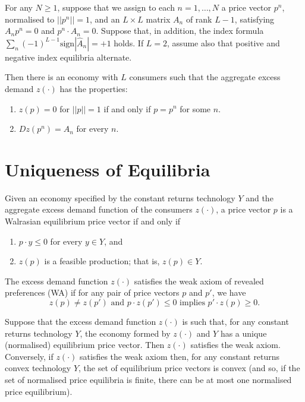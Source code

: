 \begin{prop}
    For any $N \geq 1$, suppose that we assign to each $n = 1, \dots, N$ a price vector $p^n$, normalised to $||p^n|| = 1$, and an $L \times L$ matrix $A_n$ of rank $L - 1$, satisfying $A_n p^n = 0$ and $p^n \cdot A_n = 0$. Suppose that, in addition, the index formula $\sum_n (-1)^{L - 1} \text{sign} | \hat{A}_n | = +1$ holds. If $L = 2$, assume also that positive and negative index equilibria alternate.

    Then there is an economy with $L$ consumers such that the aggregate excess demand $z(\cdot)$ has the properties:
    \begin{enumerate}
        \item $z(p) = 0$ for $||p|| = 1$ if and only if $p = p^n$ for some $n$.
        \item $D z(p^n) = A_n$ for every $n$.
    \end{enumerate}
\end{prop}


\section{Uniqueness of Equilibria}

\begin{prop}
    Given an economy specified by the constant returns technology $Y$ and the aggregate excess demand function of the consumers $z(\cdot)$, a price vector $p$ is a Walrasian equilibrium price vector if and only if 
    \begin{enumerate}
        \item $p \cdot y \leq 0$ for every $y \in Y$, and
        \item $z(p)$ is a feasible production; that is, $z(p) \in Y$.
    \end{enumerate}
\end{prop}

\begin{defn}
    The excess demand function $z(\cdot)$ satisfies the weak axiom of revealed preferences (WA) if for any pair of price vectors $p$ and $p'$, we have
    \begin{equation*}
        z(p) \neq z(p') \text{ and } p \cdot z(p') \leq 0 \text{ implies } p' \cdot z(p) \geq 0.
    \end{equation*}
\end{defn}

\begin{prop}
    Suppose that the excess demand function $z(\cdot)$ is such that, for any constant returns technology $Y$, the economy formed by $z(\cdot)$ and $Y$ has a unique (normalised) equilibrium price vector. Then $z(\cdot)$ satisfies the weak axiom. Conversely, if $z(\cdot)$ satisfies the weak axiom then, for any constant returns convex technology $Y$, the set of equilibrium price vectors is convex (and so, if the set of normalised price equilibria is finite, there can be at most one normalised price equilibrium).
\end{prop}

